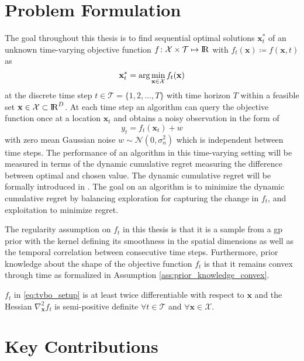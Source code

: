 \section{Problem Formulation}
\label{sec:problem_set_up}

The goal throughout this thesis is to find sequential optimal solutions $\mathbf{x}_t^*$ of an unknown time-varying objective function $f\colon \mathcal{X}\times\mathcal{T} \mapsto \mathrm{I\!R}$ with $f_t(\mathbf{x}) \coloneqq f(\mathbf{x}, t)$ as 
\begin{equation}
    \mathbf{x}_t^* = \arg\min_{\mathbf{x} \in \mathcal{X}} f_t(\mathbf{x})
    \label{eq:tvbo_setup}
\end{equation}
at the discrete time step $t\in \mathcal{T} = \{1,2, \dots, T\}$ with time horizon $T$ within a feasible set $\mathbf{x} \in \mathcal{X} \subset \mathrm{I\!R}^D$. At each time step an algorithm can query the objective function once at a location $\mathbf{x}_t$ and obtains a noisy observation in the form of
\begin{equation}
    y_t = f_t(\mathbf{x}_t) + w
\end{equation}
with zero mean Gaussian noise $w \sim \mathcal{N}\left( 0, \sigma_n^2 \right)$ which is independent between time steps.
The performance of an algorithm in this time-varying setting will be measured in terms of the dynamic cumulative regret measuring the difference between optimal and chosen value. The dynamic cumulative regret will be formally introduced in . The goal on an algorithm is to minimize the dynamic cumulative regret by balancing exploration for capturing the change in $f_t$, and exploitation to minimize regret. 

The regularity assumption on $f_t$ in this thesis is that it is a sample from a \gls{gp} prior with the kernel defining its smoothness in the spatial dimensions as well as the temporal correlation between consecutive time steps. Furthermore, prior knowledge about the shape of the objective function $f_t$ is that it remains convex through time as formalized in Assumption \ref{ass:prior_knowledge_convex}.
\begin{assumption}
$f_t$ in \eqref{eq:tvbo_setup} is at least twice differentiable with respect to $\mathbf{x}$ and the Hessian $\nabla^2_{\mathbf{x}} f_t$ is semi-positive definite $\forall t \in \mathcal{T}$ and $\forall \mathbf{x} \in \mathcal{X}$.
\label{ass:prior_knowledge_convex}
\end{assumption}


\section{Key Contributions}
\label{sec:key_contributions}

